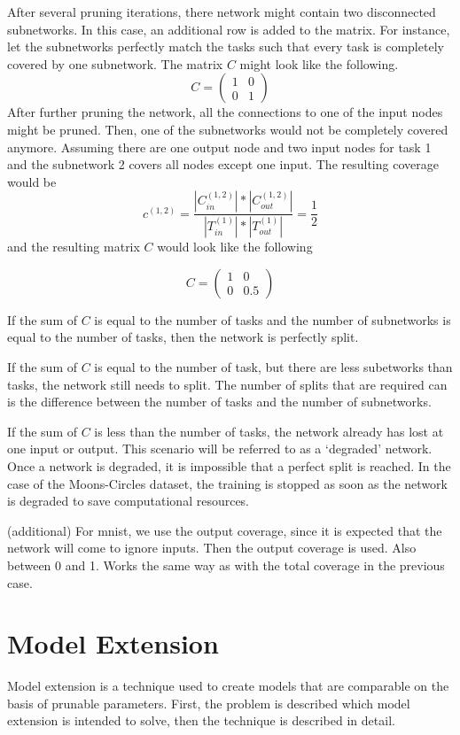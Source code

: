 After several pruning iterations, there network might contain two disconnected subnetworks.
In this case, an additional row is added to the matrix.
For instance, let the subnetworks perfectly match the tasks such that every task is completely covered by one subnetwork.
The matrix $C$ might look like the following.
\[
C = \begin{pmatrix}
    1 & 0 \\ 0 & 1
\end{pmatrix}
\]
After further pruning the network, all the connections to one of the input nodes might be pruned.
Then, one of the subnetworks would not be completely covered anymore.
Assuming there are one output node and two input nodes for task 1 and the subnetwork 2 covers all nodes except one input.
The resulting coverage would be 
\[
c^{(1,2)} =  \frac{
    | C^{(1,2)}_{in}| * | C^{(1,2)}_{out} |
    }{
    |T^{(1)}_{in}| * |T^{(1)}_{out}|
} = \frac{1}{2}
\]
and the resulting matrix $C$ would look like the following

\[
C = \begin{pmatrix}
    1 & 0 \\ 0 & 0.5
\end{pmatrix}
\]

If the sum of $C$ is equal to the number of tasks and the number of subnetworks is equal to the number of tasks, then the network is perfectly split.

If the sum of $C$ is equal to the number of task, but there are less subetworks than tasks, the network still needs to split.
The number of splits that are required can is the difference between the number of tasks and the number of subnetworks.

If the sum of $C$ is less than the number of tasks, the network already has lost at one input or output.
This scenario will be referred to as a `degraded' network.
Once a network is degraded, it is impossible that a perfect split is reached.
In the case of the Moons-Circles dataset, the training is stopped as soon as the network is degraded to save computational resources.

(additional)
For mnist, we use the output coverage, since it is expected that the network will come to ignore inputs.
Then the output coverage is used. Also between 0 and 1. Works the same way as with the total coverage in the previous case.

\section{Model Extension}
Model extension is a technique used to create models that are comparable on the basis of prunable parameters. 
First, the problem is described which model extension is intended to solve, then the technique is described in detail.
